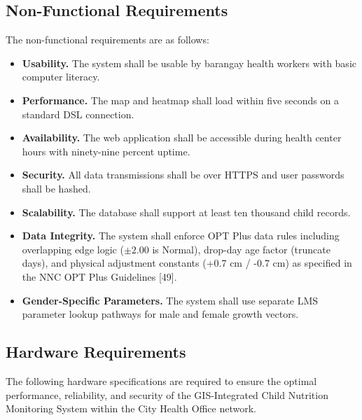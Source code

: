 \documentclass[12pt, a4paper]{report}
\begin{document}
\subsection{Non-Functional Requirements}
\label{subsec:nonfunctional}
The non-functional requirements are as follows:
\begin{itemize}
    \item \textbf{Usability.} The system shall be usable by barangay health workers with basic computer literacy.
    \item \textbf{Performance.} The map and heatmap shall load within five seconds on a standard DSL connection.
    \item \textbf{Availability.} The web application shall be accessible during health center hours with ninety-nine percent uptime.
    \item \textbf{Security.} All data transmissions shall be over HTTPS and user passwords shall be hashed.
    \item \textbf{Scalability.} The database shall support at least ten thousand child records.
    \item \textbf{Data Integrity.} The system shall enforce OPT Plus data rules including overlapping edge logic (\(\pm2.00\) is Normal), drop-day age factor (truncate days), and physical adjustment constants (+0.7 cm / -0.7 cm) as specified in the NNC OPT Plus Guidelines [49].
    \item \textbf{Gender-Specific Parameters.} The system shall use separate LMS parameter lookup pathways for male and female growth vectors.
\end{itemize}

\subsection{Hardware Requirements}
\label{subsec:hardware}
The following hardware specifications are required to ensure the optimal performance, reliability, and security of the GIS-Integrated Child Nutrition Monitoring System within the City Health Office network.
\end{document}
